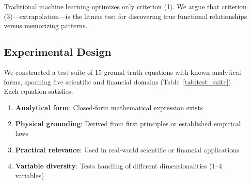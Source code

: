 \documentclass[twoside,11pt]{article}
\begin{document}
Traditional machine learning optimizes only criterion (1). We argue that criterion (3)---extrapolation---is the litmus test for discovering true functional relationships versus memorizing patterns.

\subsection{Experimental Design}

We constructed a test suite of 15 ground truth equations with known analytical forms, spanning five scientific and financial domains (Table~\ref{tab:test_suite}). Each equation satisfies:

\begin{enumerate}
    \item \textbf{Analytical form}: Closed-form mathematical expression exists
    \item \textbf{Physical grounding}: Derived from first principles or established empirical laws
    \item \textbf{Practical relevance}: Used in real-world scientific or financial applications
    \item \textbf{Variable diversity}: Tests handling of different dimensionalities (1--4 variables)
\end{enumerate}
\end{document}
